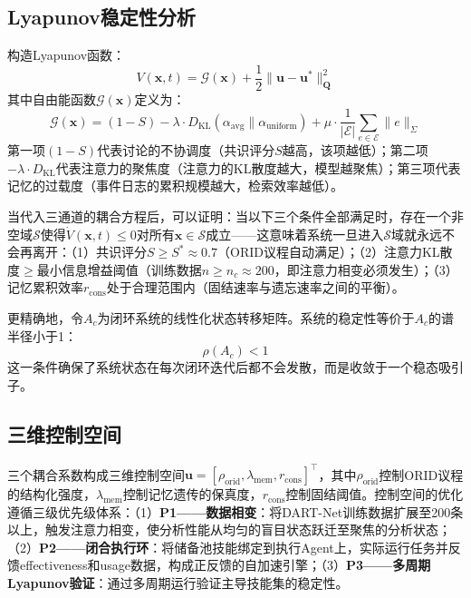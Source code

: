 \documentclass[12pt,a4paper]{ctexart}
\begin{document}
\subsection{Lyapunov稳定性分析}

构造Lyapunov函数：
\begin{equation}
V(\mathbf{x}, t) = \mathcal{G}(\mathbf{x}) + \frac{1}{2}\|\mathbf{u} - \mathbf{u}^*\|^2_{\mathbf{Q}}
\label{eq:lyapunov}
\end{equation}
其中自由能函数$\mathcal{G}(\mathbf{x})$定义为：
\begin{equation}
\mathcal{G}(\mathbf{x}) = (1 - S) - \lambda \cdot D_{\text{KL}}(\alpha_{\text{avg}} \parallel \alpha_{\text{uniform}}) + \mu \cdot \frac{1}{|\mathcal{E}|}\sum_{e\in \mathcal{E}} \|e\|_\Sigma
\label{eq:free_energy}
\end{equation}
第一项$(1-S)$代表讨论的不协调度（共识评分$S$越高，该项越低）；第二项$-\lambda \cdot D_{\text{KL}}$代表注意力的聚焦度（注意力的KL散度越大，模型越聚焦）；第三项代表记忆的过载度（事件日志的累积规模越大，检索效率越低）。

当代入三通道的耦合方程后，可以证明：当以下三个条件全部满足时，存在一个非空域$\mathcal{S}$使得$\dot{V}(\mathbf{x}, t) \leq 0$对所有$\mathbf{x} \in \mathcal{S}$成立——这意味着系统一旦进入$\mathcal{S}$域就永远不会再离开：（1）共识评分$S \geq S^* \approx 0.7$（ORID议程自动满足）；（2）注意力KL散度$\geq$最小信息增益阈值（训练数据$n \geq n_c \approx 200$，即注意力相变必须发生）；（3）记忆累积效率$r_{\text{cons}}$处于合理范围内（固结速率与遗忘速率之间的平衡）。

更精确地，令$A_c$为闭环系统的线性化状态转移矩阵。系统的稳定性等价于$A_c$的谱半径小于1：
\begin{equation}
\rho(A_c) < 1
\label{eq:spectral}
\end{equation}
这一条件确保了系统状态在每次闭环迭代后都不会发散，而是收敛于一个稳态吸引子。

\subsection{三维控制空间}

三个耦合系数构成三维控制空间$\mathbf{u} = [\rho_{\text{orid}}, \lambda_{\text{mem}}, r_{\text{cons}}]^\top$，其中$\rho_{\text{orid}}$控制ORID议程的结构化强度，$\lambda_{\text{mem}}$控制记忆遗传的保真度，$r_{\text{cons}}$控制固结阈值。控制空间的优化遵循三级优先级体系：（1）\textbf{P1——数据相变}：将DART-Net训练数据扩展至200条以上，触发注意力相变，使分析性能从均匀的盲目状态跃迁至聚焦的分析状态；（2）\textbf{P2——闭合执行环}：将储备池技能绑定到执行Agent上，实际运行任务并反馈effectiveness和usage数据，构成正反馈的自加速引擎；（3）\textbf{P3——多周期Lyapunov验证}：通过多周期运行验证主导技能集的稳定性。
\end{document}
